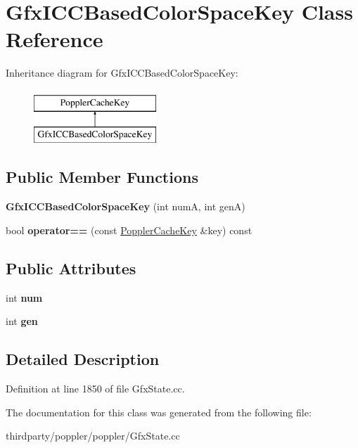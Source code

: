 \hypertarget{class_gfx_i_c_c_based_color_space_key}{}\section{Gfx\+I\+C\+C\+Based\+Color\+Space\+Key Class Reference}
\label{class_gfx_i_c_c_based_color_space_key}
Inheritance diagram for Gfx\+I\+C\+C\+Based\+Color\+Space\+Key\+:\begin{figure}[H]
\begin{center}
\leavevmode
\includegraphics[height=2.000000cm]{class_gfx_i_c_c_based_color_space_key}
\end{center}
\end{figure}
\subsection*{Public Member Functions}
\begin{DoxyCompactItemize}
\item 
\mbox{\label{class_gfx_i_c_c_based_color_space_key_a16c8036a7b5184edc78cf85eb2ebbee6}} 
{\bfseries Gfx\+I\+C\+C\+Based\+Color\+Space\+Key} (int numA, int genA)
\item 
\mbox{\label{class_gfx_i_c_c_based_color_space_key_a5d6e610835027486bf78b01a766d9dae}} 
bool {\bfseries operator==} (const \hyperlink{class_poppler_cache_key}{Poppler\+Cache\+Key} \&key) const
\end{DoxyCompactItemize}
\subsection*{Public Attributes}
\begin{DoxyCompactItemize}
\item 
\mbox{\label{class_gfx_i_c_c_based_color_space_key_a7ea4eac2da2c5b4ff50b73e9879ddea2}} 
int {\bfseries num}
\item 
\mbox{\label{class_gfx_i_c_c_based_color_space_key_ac1753255c8477dc072397ebdd71f5b0e}} 
int {\bfseries gen}
\end{DoxyCompactItemize}


\subsection{Detailed Description}


Definition at line 1850 of file Gfx\+State.\+cc.



The documentation for this class was generated from the following file\+:\begin{DoxyCompactItemize}
\item 
thirdparty/poppler/poppler/Gfx\+State.\+cc\end{DoxyCompactItemize}
